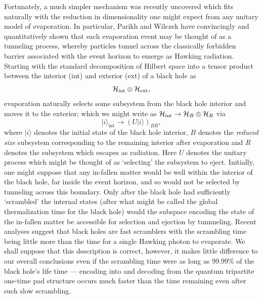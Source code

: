 \documentclass[twocolumn,aps,prl]{revtex4}
\begin{document}
Fortunately, a much simpler mechanism was recently uncovered which
fits naturally with the reduction in dimensionality one might expect from
any unitary model of evaporation. In particular, Parikh and
Wilczek \cite{ParikhWilczek} have convincingly and quantitatively shown
that each evaporation event may be thought of as a tunneling process,
whereby particles tunnel across the classically forbidden barrier
associated with the event horizon to emerge as Hawking radiation.
Starting with the standard decomposition of Hilbert space into a
tensor product between the interior (int) and exterior (ext) of a
black hole as \cite{Hawking76}
\begin{equation}
{\cal H}_{\text{int}}\otimes{\cal H}_{\text{ext}},
\end{equation}
evaporation naturally selects some subsystem from the black hole interior
and moves it to the exterior; which we might write as
${\cal H}_{\text{int}}\rightarrow{\cal H}_B\otimes {\cal H}_R$ via
\begin{equation}
|i\rangle_{\text{int}}\rightarrow (U|i\rangle)_{BR}, \label{Umodel}
\end{equation}
where $|i\rangle$ denotes the initial state of the black hole interior,
$B$ denotes the {\it reduced size\/} subsystem corresponding to
the remaining interior after evaporation and $R$ denotes the subsystem
which escapes as radiation. Here $U$ denotes the unitary process which
might be thought of as `selecting' the subsystem to eject.
Initially, one might suppose that any in-fallen matter would be well within
the interior of the black hole, far inside the event horizon, and so would
not be selected by tunneling across this boundary. Only after the
black hole had sufficiently `scrambled' the internal states (after
what might be called the global thermalization time for the black hole)
would the subspace encoding the state of the in-fallen matter be
accessible for selection and ejection by tunnneling. Recent analyses
suggest that black holes are fast scramblers \cite{Sekino08,Hayden07}
with the scrambling time being little more than the time for a
single Hawking photon to evaporate. We shall suppose that this description
is correct, however, it makes little difference to our overall conclusions
even if the scrambling time were as long as 99.99\% of the black hole's
life time \cite{Giddings07} --- encoding into and decoding from the
quantum tripartite one-time pad structure occurs much faster than the
time remaining even after such slow scrambling.
\end{document}
